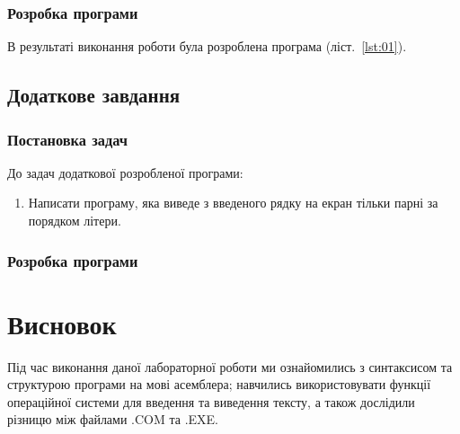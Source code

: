 \documentclass[a4paper,oneside,DIV=12,12pt]{scrartcl}
\begin{document}
			\subsubsection{Розробка програми}
				В результаті виконання роботи була розроблена програма (ліст.~\ref{lst:01}).
				
				
		\subsection{Додаткове завдання}
			\subsubsection{Постановка задач}
				До задач додаткової розробленої програми:
				\begin{enumerate}
					\item Написати програму, яка виведе з введеного рядку на екран тільки парні за порядком літери.
				\end{enumerate}
				
			\subsubsection{Розробка програми}
		
	\section{Висновок}
		Під час виконання даної лабораторної роботи ми ознайомились з синтаксисом та структурою програми на мові асемблера; навчились використовувати функції операційної системи для введення та виведення тексту, а також дослідили різницю між файлами .COM та .EXE.
\end{document}
